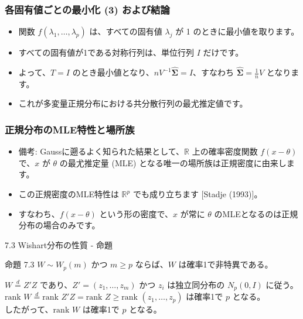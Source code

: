 \documentclass[aspectratio=169]{beamer}
\begin{document}
\begin{frame}
\frametitle{各固有値ごとの最小化 (3) および結論}
\begin{itemize}
    \item 関数 $f(\lambda_1,\dots,\lambda_p)$ は、すべての固有値 $\lambda_j$ が 1 のときに最小値を取ります。
    \item すべての固有値が1である対称行列は、単位行列 $I$ だけです。
    \item よって、$T = I$ のとき最小値となり、$nV^{-1}\hat{\bm{\Sigma}} = I$、すなわち $\hat{\bm{\Sigma}} = \frac{1}{n}V$ となります。
    \item これが多変量正規分布における共分散行列の最尤推定値です。
\end{itemize}
\end{frame}

\begin{frame}
\frametitle{正規分布のMLE特性と場所族}
\begin{itemize}
    \item 備考: Gaussに遡るよく知られた結果として、$\mathbb{R}$ 上の確率密度関数 $f(x-\theta)$ で、$x$ が $\theta$ の最尤推定量 (MLE) となる唯一の場所族は正規密度に由来します。
    \item この正規密度のMLE特性は $\mathbb{R}^p$ でも成り立ちます [Stadje (1993)]。
    \item すなわち、$f(x-\theta)$ という形の密度で、$x$ が常に $\theta$ のMLEとなるのは正規分布の場合のみです。
\end{itemize}
\end{frame}

\begin{frame}{7.3 Wishart分布の性質 - 命題}
\begin{block}{命題 7.3}
$W \sim W_p(m)$ かつ $m \ge p$ ならば、$W$ は確率1で非特異である。
\end{block}

$W \overset{d}{=} Z'Z$ であり、$Z' = (z_1, \dots, z_m)$ かつ $z_i$ は独立同分布の $N_p(0, I)$ に従う。\\
$\text{rank } W \overset{d}{=} \text{rank } Z'Z = \text{rank } Z \ge \text{rank } (z_1, \dots, z_p)$ は確率1で $p$ となる。\\
したがって、$\text{rank } W$ は確率1で $p$ となる。
\end{frame}
\end{document}
